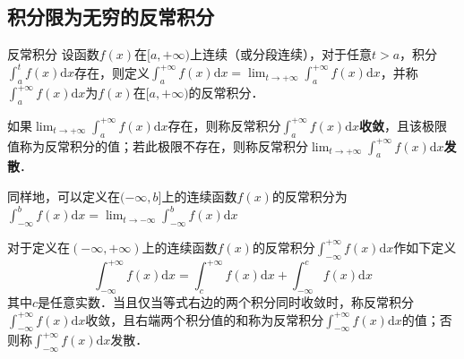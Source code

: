 \begin{issues}
\issueTODO
\end{issues}

\subsection{积分限为无穷的反常积分}
\begin{definition}{反常积分}
设函数$f(x)$在$[a, +\infty)$上连续（或分段连续），对于任意$t>a$，积分$\displaystyle \int^t_af(x)\mathrm{d} x$存在，则定义$\displaystyle \int ^{+\infty}_a f(x)\mathrm{d} x=\lim_{t\rightarrow+\infty }\int _a^{+\infty}f(x)\mathrm{d} x$，并称$\displaystyle \int ^{+\infty}_a f(x)\mathrm{d} x $为$f(x)$在$[a, +\infty)$的反常积分．

如果$\displaystyle \lim_{t\rightarrow+\infty }\int _a^{+\infty}f(x)\mathrm{d} x$存在，则称反常积分$\displaystyle \int ^{+\infty}_a f(x)\mathrm{d} x$\textbf{收敛}，且该极限值称为反常积分的值；若此极限不存在，则称反常积分$\displaystyle \lim_{t\rightarrow+\infty }\int _a^{+\infty}f(x)\mathrm{d} x$\textbf{发散}．
\end{definition}

同样地，可以定义在$(-\infty,b]$上的连续函数$f(x)$的反常积分为$\displaystyle \int ^b _{-\infty}f(x)\mathrm{d} x=\lim_{t\rightarrow-\infty }\int ^b _{-\infty}f(x)\mathrm{d} x$

对于定义在$(-\infty,+\infty )$上的连续函数$f(x)$的反常积分$\displaystyle \int ^{+\infty}_{-\infty}f(x)\mathrm{d} x$作如下定义
$$\displaystyle \int ^{+\infty}_{-\infty}f(x)\mathrm{d} x=\displaystyle \int ^{+\infty}_c f(x)\mathrm{d} x+\displaystyle \int ^c _{-\infty}f(x)\mathrm{d} x$$
其中$c$是任意实数．当且仅当等式右边的两个积分同时收敛时，称反常积分$\displaystyle \int ^{+\infty}_{-\infty}f(x)\mathrm{d} x$收敛，且右端两个积分值的和称为反常积分$\displaystyle \int ^{+\infty}_{-\infty}f(x)\mathrm{d} x$的值；否则称$\displaystyle \int ^{+\infty}_{-\infty}f(x)\mathrm{d} x$发散．